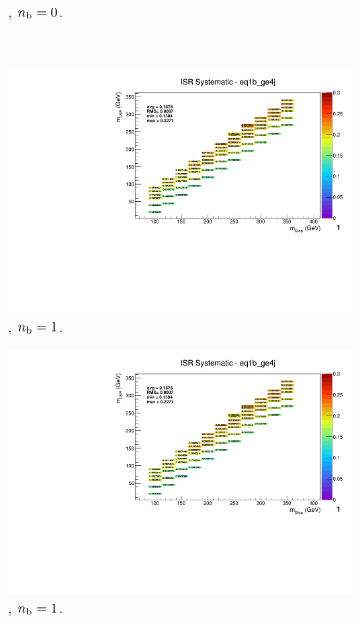 \begin{figure}[ht!]
\begin{subfigure}[b]{0.32\textwidth}
    \caption{\njhigh, $n_{\text{b}} = 0$.}
  \end{subfigure}\\
  \begin{subfigure}[b]{0.32\textwidth}
    \includegraphics[width=\textwidth, page=12]{Figs/sms/t2cc/v37_2/systs/T2cc_ISR_eq1b_ge4j.pdf}
    \caption{\njhigh, $n_{\text{b}} = 1$.}
  \end{subfigure}
  \begin{subfigure}[b]{0.32\textwidth}
    \includegraphics[width=\textwidth, page=8]{Figs/sms/t2cc/v37_2/systs/T2cc_ISR_eq1b_ge4j.pdf}
    \caption{\njhigh, $n_{\text{b}} = 1$.}
  \end{subfigure}
  \begin{subfigure}[b]{0.32\textwidth}

\end{subfigure}
\end{figure}
